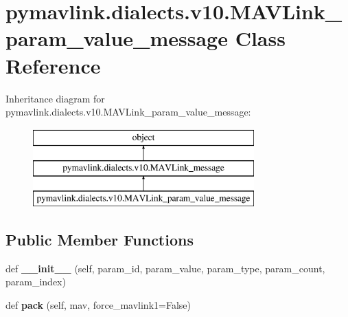 \hypertarget{classpymavlink_1_1dialects_1_1v10_1_1MAVLink__param__value__message}{}\section{pymavlink.\+dialects.\+v10.\+M\+A\+V\+Link\+\_\+param\+\_\+value\+\_\+message Class Reference}
\label{classpymavlink_1_1dialects_1_1v10_1_1MAVLink__param__value__message}
Inheritance diagram for pymavlink.\+dialects.\+v10.\+M\+A\+V\+Link\+\_\+param\+\_\+value\+\_\+message\+:\begin{figure}[H]
\begin{center}
\leavevmode
\includegraphics[height=3.000000cm]{classpymavlink_1_1dialects_1_1v10_1_1MAVLink__param__value__message}
\end{center}
\end{figure}
\subsection*{Public Member Functions}
\begin{DoxyCompactItemize}
\item 
\mbox{\label{classpymavlink_1_1dialects_1_1v10_1_1MAVLink__param__value__message_a57cbdd4940fe85af0248489573a8bd17}} 
def {\bfseries \+\_\+\+\_\+init\+\_\+\+\_\+} (self, param\+\_\+id, param\+\_\+value, param\+\_\+type, param\+\_\+count, param\+\_\+index)
\item 
\mbox{\label{classpymavlink_1_1dialects_1_1v10_1_1MAVLink__param__value__message_a3ae99d216a62df169d3e719d97ee6064}} 
def {\bfseries pack} (self, mav, force\+\_\+mavlink1=False)
\end{DoxyCompactItemize}

